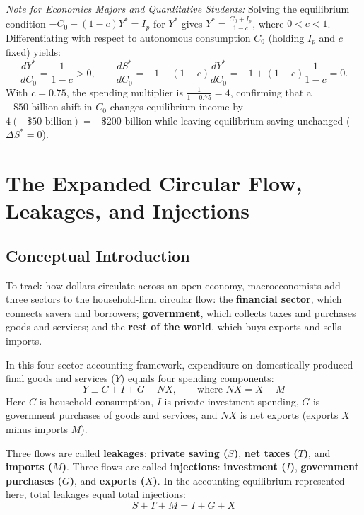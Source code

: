 \documentclass[11pt,letterpaper]{article}
\begin{document}
\begin{tcolorbox}[colback=LightSlate,colframe=CourseBlue,title=\textbf{Optional Advanced Section: Comparative Statics of the Paradox of Thrift}]
\small
\emph{Note for Economics Majors and Quantitative Students:}
Solving the equilibrium condition $-C_0 + (1 - c)Y^* = I_p$ for $Y^*$ gives $Y^* = \frac{C_0 + I_p}{1 - c}$, where $0 < c < 1$. Differentiating with respect to autonomous consumption $C_0$ (holding $I_p$ and $c$ fixed) yields:
\[
\frac{dY^*}{dC_0} = \frac{1}{1 - c} > 0, \qquad \frac{dS^*}{dC_0} = -1 + (1 - c)\frac{dY^*}{dC_0} = -1 + (1 - c)\frac{1}{1 - c} = 0.
\]
With $c = 0.75$, the spending multiplier is $\frac{1}{1 - 0.75} = 4$, confirming that a $-\$50\text{ billion}$ shift in $C_0$ changes equilibrium income by $4(-\$50\text{ billion}) = -\$200\text{ billion}$ while leaving equilibrium saving unchanged ($\Delta S^* = 0$).
\end{tcolorbox}

\section{The Expanded Circular Flow, Leakages, and Injections}

\subsection*{Conceptual Introduction}
To track how dollars circulate across an open economy, macroeconomists add three sectors to the household-firm circular flow: the \textbf{financial sector}, which connects savers and borrowers; \textbf{government}, which collects taxes and purchases goods and services; and the \textbf{rest of the world}, which buys exports and sells imports.

In this four-sector accounting framework, expenditure on domestically produced final goods and services ($Y$) equals four spending components:
\begin{equation}
Y \equiv C + I + G + NX, \qquad \text{where } NX = X - M
\end{equation}
Here $C$ is household consumption, $I$ is private investment spending, $G$ is government purchases of goods and services, and $NX$ is net exports (exports $X$ minus imports $M$).

Three flows are called \textbf{leakages}: \textbf{private saving ($S$)}, \textbf{net taxes ($T$)}, and \textbf{imports ($M$)}. Three flows are called \textbf{injections}: \textbf{investment ($I$)}, \textbf{government purchases ($G$)}, and \textbf{exports ($X$)}. In the accounting equilibrium represented here, total leakages equal total injections:
\begin{equation}
S + T + M = I + G + X
\end{equation}
\end{document}

